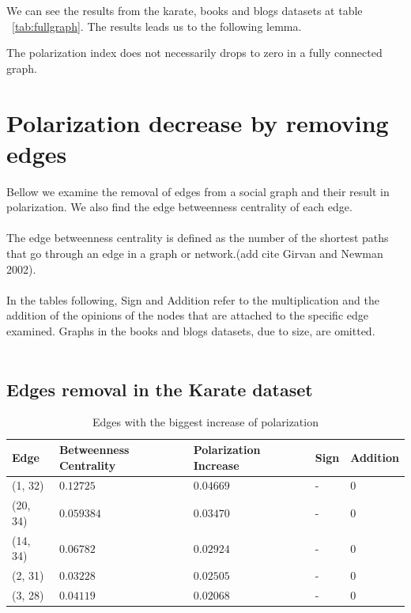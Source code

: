 \begin{table}[H]
\vspace{20pt}
\noindent
We can see the results from the karate, books and blogs datasets at table ~\ref{tab:fullgraph}. The results leads us to the following lemma.
\\	
\begin{lemma}
The polarization index does not necessarily drops to zero in a fully connected graph.
\end{lemma}


\section{Polarization decrease by removing edges}
\label{sec:polremovingdecrease}
Bellow we examine the removal of edges from a social graph and their result in polarization. We also find the edge betweenness centrality of each edge. 
\\
\\
The edge betweenness centrality is defined as the number of the shortest paths that go through an edge in a graph or network.(add cite Girvan and Newman 2002). 
\\
\\
In the tables following, Sign and Addition refer to the multiplication and the addition of the opinions of the nodes that are attached to the specific edge examined. Graphs in the books and blogs datasets, due to size, are omitted.
\\
\\

\subsection{Edges removal in the Karate dataset}

\begin{table}[H]
 \centering
 \caption{Edges with the biggest increase of polarization}
 \label{tab:edgesLargest}
 \begin{tabular}{| l || l | l | l | l |}
 \hline
  Edge & Betweenness Centrality & Polarization Increase & Sign & Addition\\
  \hline
  \hline
  (1, 32) & $0.12725$ & $0.04669$ & - &  0\\
  \hline
  (20, 34) & $0.059384$ & $0.03470$ & - &  0\\
  \hline
  (14, 34) & $0.06782$ & $0.02924$ & - &  0\\
  \hline
  (2, 31) & $0.03228$ & $0.02505$ & - &  0\\
  \hline
  (3, 28) & $0.04119$ & $0.02068$ & - &  0\\
  \hline
 \end{tabular}
  

\end{table}
\end{table}
